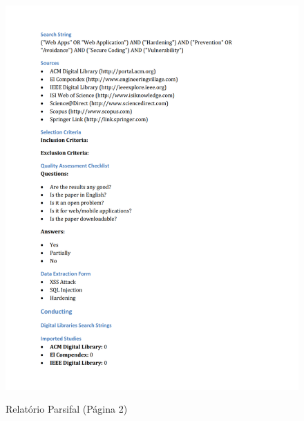\begin{figure}[H]
    \centering
    \caption{Relatório Parsifal (Página 2)}
    \includegraphics[width=16cm]{figuras/parsifal_report_2.png} 
    \label{fig:internet} 
\end{figure}
